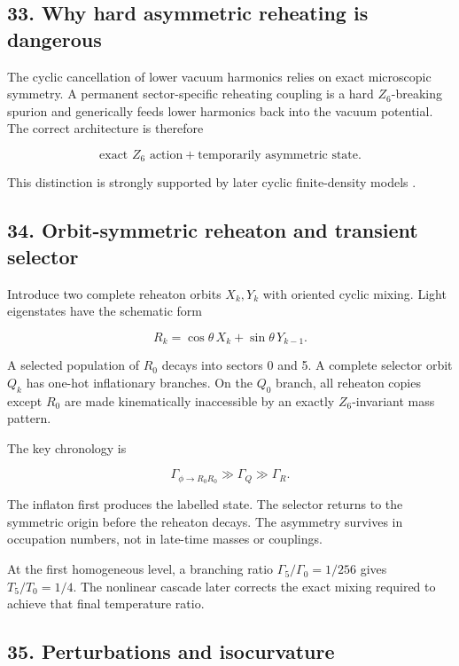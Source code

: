 \documentclass[
]{article}
\begin{document}
\subsection{33. Why hard asymmetric reheating is
dangerous}\label{why-hard-asymmetric-reheating-is-dangerous}

The cyclic cancellation of lower vacuum harmonics relies on exact
microscopic symmetry. A permanent sector-specific reheating coupling is
a hard \(Z_6\)-breaking spurion and generically feeds lower harmonics
back into the vacuum potential. The correct architecture is therefore

\[
\boxed{
\text{exact }Z_6\text{ action}
+\text{temporarily asymmetric state}.
}
\]

This distinction is strongly supported by later cyclic finite-density
models .

\subsection{34. Orbit-symmetric reheaton and transient
selector}\label{orbit-symmetric-reheaton-and-transient-selector}

Introduce two complete reheaton orbits \(X_k,Y_k\) with oriented cyclic
mixing. Light eigenstates have the schematic form

\[
R_k=\cos\theta\,X_k+\sin\theta\,Y_{k-1}.
\]

A selected population of \(R_0\) decays into sectors 0 and 5. A complete
selector orbit \(Q_k\) has one-hot inflationary branches. On the \(Q_0\)
branch, all reheaton copies except \(R_0\) are made kinematically
inaccessible by an exactly \(Z_6\)-invariant mass pattern.

The key chronology is

\[
\Gamma_{\phi\rightarrow R_0R_0}
\gg\Gamma_Q\gg\Gamma_R.
\]

The inflaton first produces the labelled state. The selector returns to
the symmetric origin before the reheaton decays. The asymmetry survives
in occupation numbers, not in late-time masses or couplings.

At the first homogeneous level, a branching ratio
\(\Gamma_5/\Gamma_0=1/256\) gives \(T_5/T_0=1/4\). The nonlinear cascade
later corrects the exact mixing required to achieve that final
temperature ratio.

\subsection{35. Perturbations and
isocurvature}\label{perturbations-and-isocurvature}
\end{document}
